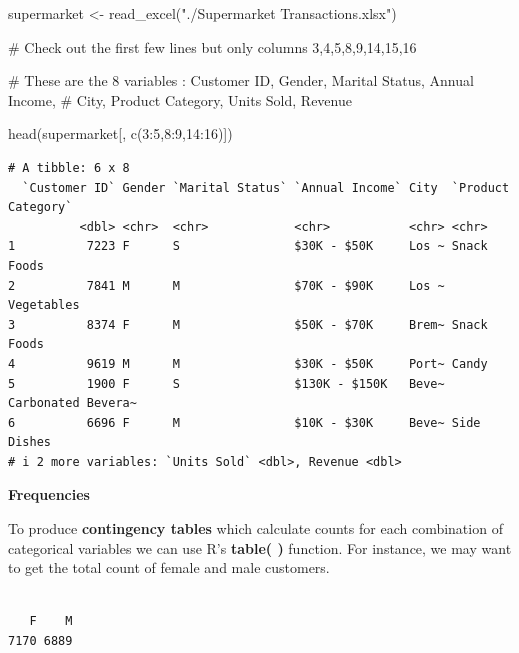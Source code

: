 \documentclass[
  letterpaper,
  DIV=11,
  numbers=noendperiod]{scrreprt}
\newenvironment{Shaded}{\begin{snugshade}}{\end{snugshade}}
\newcommand{\CommentTok}[1]{\textcolor[rgb]{0.37,0.37,0.37}{#1}}
\newcommand{\DecValTok}[1]{\textcolor[rgb]{0.68,0.00,0.00}{#1}}
\newcommand{\FunctionTok}[1]{\textcolor[rgb]{0.28,0.35,0.67}{#1}}
\newcommand{\NormalTok}[1]{\textcolor[rgb]{0.00,0.23,0.31}{#1}}
\newcommand{\OtherTok}[1]{\textcolor[rgb]{0.00,0.23,0.31}{#1}}
\newcommand{\SpecialCharTok}[1]{\textcolor[rgb]{0.37,0.37,0.37}{#1}}
\newcommand{\StringTok}[1]{\textcolor[rgb]{0.13,0.47,0.30}{#1}}
\begin{document}
\begin{Shaded}
\begin{Highlighting}[]
\NormalTok{supermarket }\OtherTok{\textless{}{-}} \FunctionTok{read\_excel}\NormalTok{(}\StringTok{"./Supermarket Transactions.xlsx"}\NormalTok{)}

\CommentTok{\# Check out the first few lines but only columns 3,4,5,8,9,14,15,16}

\CommentTok{\# These are the 8 variables : Customer ID, Gender, Marital Status, Annual Income,}
\CommentTok{\# City, Product Category, Units Sold, Revenue}

\FunctionTok{head}\NormalTok{(supermarket[, }\FunctionTok{c}\NormalTok{(}\DecValTok{3}\SpecialCharTok{:}\DecValTok{5}\NormalTok{,}\DecValTok{8}\SpecialCharTok{:}\DecValTok{9}\NormalTok{,}\DecValTok{14}\SpecialCharTok{:}\DecValTok{16}\NormalTok{)])}
\end{Highlighting}
\end{Shaded}

\begin{verbatim}
# A tibble: 6 x 8
  `Customer ID` Gender `Marital Status` `Annual Income` City  `Product Category`
          <dbl> <chr>  <chr>            <chr>           <chr> <chr>             
1          7223 F      S                $30K - $50K     Los ~ Snack Foods       
2          7841 M      M                $70K - $90K     Los ~ Vegetables        
3          8374 F      M                $50K - $70K     Brem~ Snack Foods       
4          9619 M      M                $30K - $50K     Port~ Candy             
5          1900 F      S                $130K - $150K   Beve~ Carbonated Bevera~
6          6696 F      M                $10K - $30K     Beve~ Side Dishes       
# i 2 more variables: `Units Sold` <dbl>, Revenue <dbl>
\end{verbatim}

\textbf{Frequencies}

To produce \textbf{contingency tables} which calculate counts for each
combination of categorical variables we can use R's \textbf{table( )}
function. For instance, we may want to get the total count of female and
male customers.

\begin{Shaded}
\end{Shaded}

\begin{verbatim}

   F    M 
7170 6889 
\end{verbatim}
\end{document}
